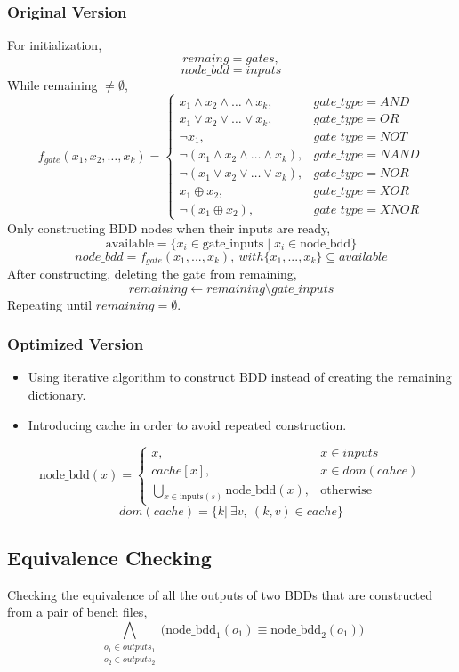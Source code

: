 \documentclass{article}
\begin{document}
\subsubsection{Original Version}
For initialization,
\[
remaing = gates,
\]
\[ 
node\_bdd = inputs
\]
While remaining $\neq \emptyset$,
\[
f_{gate}(x_1, x_2, \dots, x_k) =
\begin{cases}
x_1 \wedge x_2 \wedge \dots \wedge x_k, & gate\_type = AND \\
x_1 \vee x_2 \vee \dots \vee x_k, & gate\_type = OR \\
\neg x_1, & gate\_type = NOT \\
\neg (x_1 \wedge x_2 \wedge \dots \wedge x_k), & gate\_type = NAND \\
\neg (x_1 \vee x_2 \vee \dots \vee x_k), & gate\_type = NOR \\
x_1 \oplus x_2, & gate\_type = XOR \\
\neg (x_1 \oplus x_2), & gate\_type = XNOR
\end{cases}
\]
Only constructing BDD nodes when their inputs are ready,
\[
\text{available} = \{ x_i \in \text{gate\_inputs} \mid x_i \in \text{node\_bdd} \}
\]
\[
node\_bdd = f_{gate}(x_1,...,x_k), \ with \{x_1,...,x_k\} \subseteq available
\]
After constructing, deleting the gate from remaining,
\[
remaining \gets remaining \setminus {gate\_inputs}
\]
Repeating until $remaining = \emptyset$.

\subsubsection{Optimized Version}
\begin{itemize}
  \item Using iterative algorithm to construct BDD instead of creating the remaining dictionary.
  \item Introducing cache in order to avoid repeated construction.
\end{itemize}
\[
\text{node\_bdd}(x) =
\begin{cases}
x, & x \in inputs \\[8pt]
cache[x], & x \in dom(cahce)\\
\displaystyle \bigcup_{x \in \text{inputs}(s)} \text{node\_bdd}(x), & \text{otherwise}
\end{cases}
\]
\[
dom(cache) = \{ k  | \ \exists v, \ (k,v) \in cache\}
\]


\subsection{Equivalence Checking}
Checking the equivalence of all the outputs of two BDDs that are constructed from a pair of bench files,
\[
\bigwedge_{\substack{o_1 \in outputs_1 \\ o_2 \in outputs_2}} \big( \text{node\_bdd}_1(o_1) \equiv \text{node\_bdd}_2(o_1) \big)
\]
\end{document}
